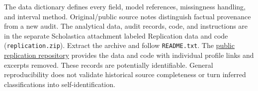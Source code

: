 \documentclass[11pt]{article}
\begin{document}
The data dictionary defines every field, model references, missingness handling, and interval method. Original/public source notes distinguish factual provenance from a new audit. The analytical data, audit records, code, and instructions are in the separate Scholastica attachment labeled Replication data and code (\texttt{replication.zip}). Extract the archive and follow \texttt{README.txt}. The \href{https://github.com/werdnabae/transportation-faculty-doctoral-cohorts}{public replication repository} provides the data and code with individual profile links and excerpts removed. These records are potentially identifiable. General reproducibility does not validate historical source completeness or turn inferred classifications into self-identification.

\end{document}
